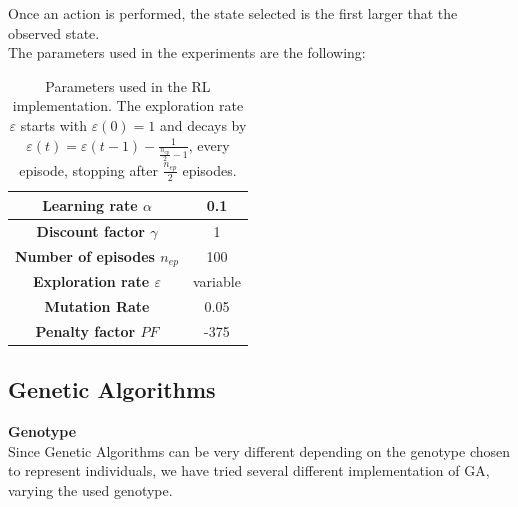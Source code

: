 Once an action is performed, the state selected is the first larger that the observed state.\\
The parameters used in the experiments are the following:


\begin{table}[htb]%
	\centering
	\label{tab:RL_parameters}
	\begin{tabular}{|S|S|} 		%
		
		\hline
		{\textbf{Learning rate $\alpha$}} &  {0.1} \\
		\hline
		{\textbf{Discount factor $\gamma$}} & {1} \\
		\hline
		{\textbf{Number of episodes $n_{ep}$}} & {100} \\
		\hline
		{\textbf{Exploration rate $\varepsilon$}}  & {variable} \\
		\hline
		{\textbf{Mutation Rate}} & {0.05} \\
		\hline
		{\textbf{Penalty factor $PF$}}& {-375} \\
		\hline
		
	\end{tabular}
	\caption{Parameters used in the RL implementation. The exploration rate $\varepsilon$ starts with $\varepsilon(0)=1$ and decays by $\varepsilon(t) = \varepsilon(t - 1) - \frac{1}{\frac{n_{ep}}{2} - 1}$, every episode, stopping after $\frac{n_{ep}}{2}$ episodes. }
\end{table}



\subsection{Genetic Algorithms}

\textbf{Genotype}\\
Since Genetic Algorithms can be very different depending on the genotype chosen to represent individuals, we have tried several different implementation of GA, varying the used genotype.
\\


